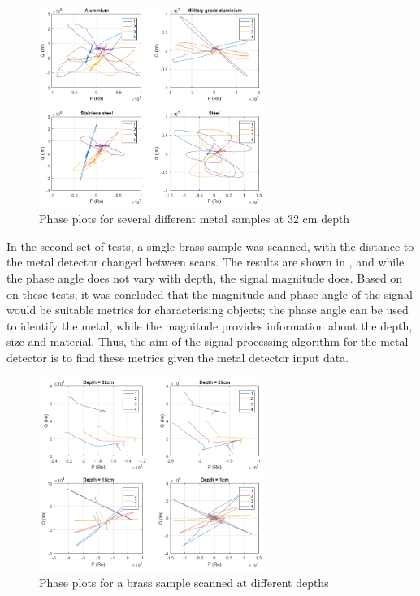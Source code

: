 \documentclass[main.tex]{subfiles}
\begin{document}
\begin{figure}[ht]
\includegraphics[width=0.65\textwidth]{3-ConceptDesign/metals.PNG}
\centering
\caption{Phase plots for several different metal samples at 32 cm depth} 
\end{figure}

In the second set of tests, a single brass sample was scanned, with the distance to the metal detector changed between scans. The results are shown in , and while the phase angle does not vary with depth, the signal magnitude does. Based on on these tests,   it was concluded that the magnitude and phase angle of the signal would be suitable metrics for characterising objects; the phase angle can be used to identify the metal, while the magnitude provides information about the depth, size and material. Thus, the aim of the signal processing algorithm for the metal detector is to find these metrics given the metal detector input data. 

\begin{figure}[ht]
\includegraphics[width=0.65\textwidth]{3-ConceptDesign/phaseDepth.PNG}
\centering
\caption{Phase plots for a brass sample scanned at different depths} 
\end{figure}
\end{document}
